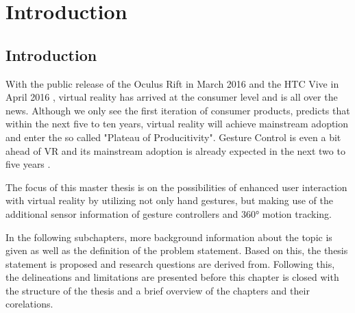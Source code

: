 
\chapter{Introduction} %

\label{ChapterIntroduction} %


\section{Introduction}

With the public release of the Oculus Rift in March 2016 \citep{Oculus2016} and the HTC Vive in April 2016 \citep{Htcvive2016}, virtual reality has arrived at the consumer level and is all over the news. Although we only see the first iteration of consumer products, \cite{Gartner2015} predicts that within the next five to ten years, virtual reality will achieve mainstream adoption and enter the so called "Plateau of Producitivity". Gesture Control is even a bit ahead of VR and its mainstream adoption is already expected in the next two to five years \citep{Gartner2015}.

The focus of this master thesis is on the possibilities of enhanced user interaction with virtual reality by utilizing not only hand gestures, but making use of the additional sensor information of gesture controllers and 360° motion tracking.

In the following subchapters, more background information about the topic is given as well as the definition of the problem statement. Based on this, the thesis statement is proposed and research questions are derived from. Following this, the delineations and limitations are presented before this chapter is closed with the structure of the thesis and a brief overview of the chapters and their corelations.



